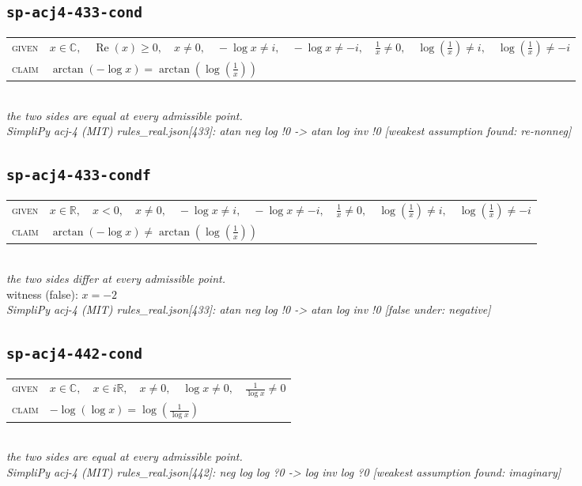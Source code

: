 \documentclass[11pt]{article}
\begin{document}
\subsection*{\texttt{sp-acj4-433-cond}}
\begin{tabular}{@{}l@{\quad}l@{}}
\textsc{given} & $x \in \mathbb{C},\quad \operatorname{Re}\left(x\right) \ge 0,\quad x \neq 0,\quad -\log x \neq i,\quad -\log x \neq -i,\quad \frac{1}{x} \neq 0,\quad \log\left(\frac{1}{x}\right) \neq i,\quad \log\left(\frac{1}{x}\right) \neq -i$ \\[4pt]
\textsc{claim} & $\displaystyle \arctan\left(-\log x\right) = \arctan\left(\log\left(\frac{1}{x}\right)\right)$ \\
\end{tabular}\\[2pt]
{\small\emph{the two sides are equal at every admissible point.}}\\
\emph{SimpliPy acj-4 (MIT) rules\_real.json[433]: atan neg log !0  ->  atan log inv !0  [weakest assumption found: re-nonneg]}\\

\subsection*{\texttt{sp-acj4-433-condf}}
\begin{tabular}{@{}l@{\quad}l@{}}
\textsc{given} & $x \in \mathbb{R},\quad x < 0,\quad x \neq 0,\quad -\log x \neq i,\quad -\log x \neq -i,\quad \frac{1}{x} \neq 0,\quad \log\left(\frac{1}{x}\right) \neq i,\quad \log\left(\frac{1}{x}\right) \neq -i$ \\[4pt]
\textsc{claim} & $\displaystyle \arctan\left(-\log x\right) \neq \arctan\left(\log\left(\frac{1}{x}\right)\right)$ \\
\end{tabular}\\[2pt]
{\small\emph{the two sides differ at every admissible point.}}\\
{\footnotesize\color{gray}witness (false): $x = -2$}\\
\emph{SimpliPy acj-4 (MIT) rules\_real.json[433]: atan neg log !0  ->  atan log inv !0  [false under: negative]}\\

\subsection*{\texttt{sp-acj4-442-cond}}
\begin{tabular}{@{}l@{\quad}l@{}}
\textsc{given} & $x \in \mathbb{C},\quad x \in i\mathbb{R},\quad x \neq 0,\quad \log x \neq 0,\quad \frac{1}{\log x} \neq 0$ \\[4pt]
\textsc{claim} & $\displaystyle -\log\left(\log x\right) = \log\left(\frac{1}{\log x}\right)$ \\
\end{tabular}\\[2pt]
{\small\emph{the two sides are equal at every admissible point.}}\\
\emph{SimpliPy acj-4 (MIT) rules\_real.json[442]: neg log log ?0  ->  log inv log ?0  [weakest assumption found: imaginary]}\\
\end{document}
